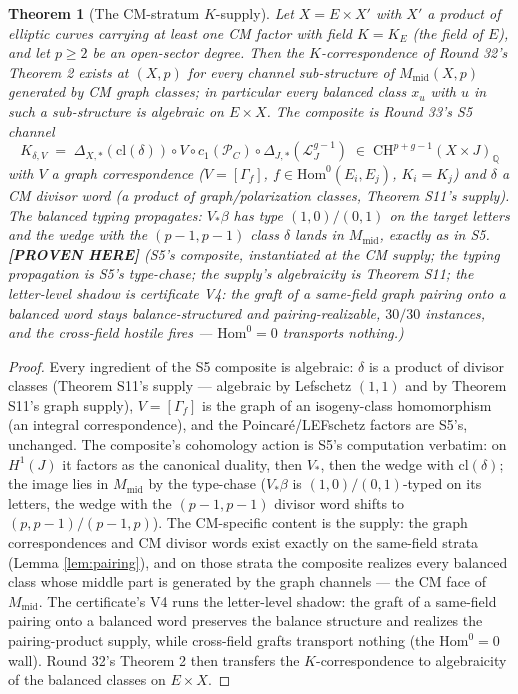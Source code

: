 \documentclass[11pt]{article}
\newtheorem{theorem}{Theorem}
\newcommand{\PROVEN}{\textbf{[PROVEN HERE]}}
\newcommand{\Q}{\mathbb{Q}}
\newcommand{\CH}{\mathrm{CH}}
\newcommand{\Hom}{\mathrm{Hom}}
\begin{document}
\begin{theorem}[The CM-stratum $K$-supply]\label{thm:s12}
Let $X=E\times X'$ with $X'$ a product of elliptic curves carrying at
least one CM factor with field $K=K_E$ (the field of $E$), and let
$p\ge2$ be an open-sector degree. Then the $K$-correspondence of
Round 32's Theorem 2 exists at $(X,p)$ for every channel sub-structure
of $M_{\mathrm{mid}}(X,p)$ generated by CM graph classes; in particular
every balanced class $x_u$ with $u$ in such a sub-structure is algebraic
on $E\times X$. The composite is Round 33's S5 channel
\[
K_{\delta,V}\;=\;\Delta_{X,*}(\mathrm{cl}(\delta))\circ V\circ
c_1(\mathcal P_C)\circ\Delta_{J,*}(\mathcal L_J^{g-1})
\;\in\;\CH^{p+g-1}(X\times J)_\Q
\]
with $V$ a \emph{graph} correspondence ($V=[\Gamma_f]$,
$f\in\Hom^0(E_i,E_j)$, $K_i=K_j$) and $\delta$ a \emph{CM divisor word}
(a product of graph/polarization classes, Theorem S11's supply). The
balanced typing propagates: $V_*\beta$ has type $(1,0)/(0,1)$ on the
target letters and the wedge with the $(p-1,p-1)$ class $\delta$ lands
in $M_{\mathrm{mid}}$, exactly as in S5.
\PROVEN{} (S5's composite, instantiated at the CM supply; the typing
propagation is S5's type-chase; the supply's algebraicity is Theorem
S11; the letter-level shadow is certificate V4: the graft of a
same-field graph pairing onto a balanced word stays balance-structured
and pairing-realizable, $30/30$ instances, and the cross-field hostile
fires --- $\Hom^0=0$ transports nothing.)
\end{theorem}

\begin{proof}
Every ingredient of the S5 composite is algebraic: $\delta$ is a product
of divisor classes (Theorem S11's supply --- algebraic by Lefschetz
$(1,1)$ and by Theorem S11's graph supply), $V=[\Gamma_f]$ is the graph
of an isogeny-class homomorphism (an integral correspondence), and the
Poincar\'e/LEFschetz factors are S5's, unchanged. The composite's
cohomology action is S5's computation verbatim: on $H^1(J)$ it factors
as the canonical duality, then $V_*$, then the wedge with
$\mathrm{cl}(\delta)$; the image lies in $M_{\mathrm{mid}}$ by the
type-chase ($V_*\beta$ is $(1,0)/(0,1)$-typed on its letters, the wedge
with the $(p-1,p-1)$ divisor word shifts to $(p,p-1)/(p-1,p)$). The
CM-specific content is the supply: the graph correspondences and CM
divisor words exist exactly on the same-field strata (Lemma
\ref{lem:pairing}), and on those strata the composite realizes every
balanced class whose middle part is generated by the graph channels ---
the CM face of $M_{\mathrm{mid}}$. The certificate's V4 runs the
letter-level shadow: the graft of a same-field pairing onto a balanced
word preserves the balance structure and realizes the pairing-product
supply, while cross-field grafts transport nothing (the $\Hom^0=0$
wall). Round 32's Theorem 2 then transfers the $K$-correspondence to
algebraicity of the balanced classes on $E\times X$.
\end{proof}
\end{document}
